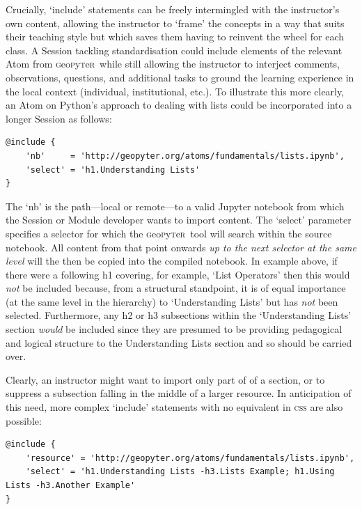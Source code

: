 \documentclass[letter, 11pt]{article}
\newcommand{\gp}{\textsc{g}eo\textsc{p}y\textsc{t}e\textsc{r}~\/}
\begin{document}
Crucially, `include' statements can be freely intermingled with the instructor's
own content, allowing the instructor to `frame' the concepts in a way that suits
their teaching style but which saves them having to reinvent the wheel for each
class. A Session tackling standardisation could include elements of the relevant
Atom from \gp while still allowing the instructor to interject comments,
observations, questions, and additional tasks to ground the learning experience
in the local context (individual, institutional, etc.). To illustrate this more
clearly, an Atom on Python's approach to dealing with lists could be
incorporated into a longer Session as follows:

\begin{Verbatim}[fontsize=\small]
@include {
    'nb'     = 'http://geopyter.org/atoms/fundamentals/lists.ipynb',
    'select' = 'h1.Understanding Lists'
}
\end{Verbatim}

The `nb' is the path---local or remote---to a valid Jupyter notebook from which
the Session or Module developer wants to import content. The `select' parameter
specifies a selector for which the \gp tool will search within the source
notebook. All content from that point onwards \emph{up to the next selector at
the same level} will the then be copied into the compiled notebook. In example
above, if there were a following h1 covering, for example, `List Operators' then
this would \emph{not} be included because, from a structural standpoint, it is
of equal importance (at the same level in the hierarchy) to `Understanding
Lists' but has \emph{not} been selected. Furthermore, any h2 or h3 subsections
within the `Understanding Lists' section \textit{would} be included since they
are presumed to be providing pedagogical and logical structure to the
Understanding Lists section and so should be carried over.

Clearly, an instructor might want to import only part of of a section, or to
suppress a subsection falling in the middle of a larger resource. In
anticipation of this need, more complex `include' statements with no equivalent
in \textsc{css} are also possible:

\begin{Verbatim}[fontsize=\small]
@include {
    'resource' = 'http://geopyter.org/atoms/fundamentals/lists.ipynb',
    'select' = 'h1.Understanding Lists -h3.Lists Example; h1.Using Lists -h3.Another Example'
}
\end{Verbatim}
\end{document}
